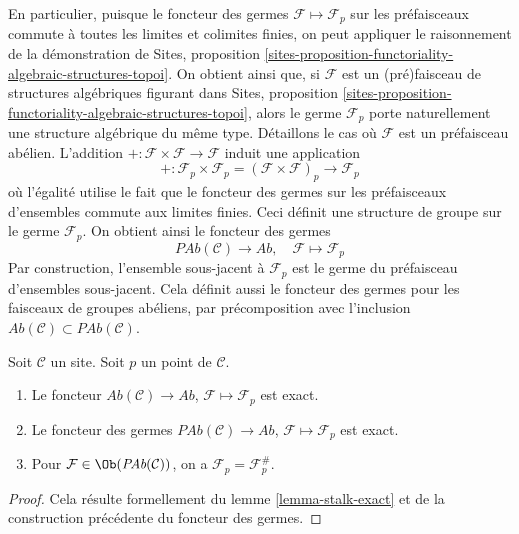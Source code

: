 \noindent
En particulier, puisque le foncteur des germes
$\mathcal{F} \mapsto \mathcal{F}_p$ sur les préfaisceaux commute à toutes les
limites et colimites finies, on peut appliquer le raisonnement de la
démonstration de Sites, proposition
\ref{sites-proposition-functoriality-algebraic-structures-topoi}.
On obtient ainsi que, si $\mathcal{F}$ est un (pré)faisceau de structures
algébriques figurant dans Sites, proposition
\ref{sites-proposition-functoriality-algebraic-structures-topoi}, alors le germe
$\mathcal{F}_p$ porte naturellement une structure algébrique du même type.
Détaillons le cas où $\mathcal{F}$ est un préfaisceau abélien. L'addition
$+ : \mathcal{F} \times \mathcal{F} \to \mathcal{F}$ induit une application
$$
+ :
\mathcal{F}_p \times \mathcal{F}_p
=
(\mathcal{F} \times \mathcal{F})_p
\longrightarrow
\mathcal{F}_p
$$
où l'égalité utilise le fait que le foncteur des germes sur les préfaisceaux
d'ensembles commute aux limites finies. Ceci définit une structure de groupe
sur le germe $\mathcal{F}_p$. On obtient ainsi le foncteur des germes
$$
\textit{PAb}(\mathcal{C}) \longrightarrow \textit{Ab}, \quad
\mathcal{F} \longmapsto \mathcal{F}_p
$$
Par construction, l'ensemble sous-jacent à $\mathcal{F}_p$ est le germe du
préfaisceau d'ensembles sous-jacent. Cela définit aussi le foncteur des germes pour
les faisceaux de groupes abéliens, par précomposition avec l'inclusion
$\textit{Ab}(\mathcal{C}) \subset \textit{PAb}(\mathcal{C})$.

\begin{lemma}
\label{lemma-stalk-exact-abelian}
Soit $\mathcal{C}$ un site.
Soit $p$ un point de $\mathcal{C}$.
\begin{enumerate}
\item Le foncteur
$\textit{Ab}(\mathcal{C}) \to \textit{Ab}$,
$\mathcal{F} \mapsto \mathcal{F}_p$ est exact.
\item Le foncteur des germes
$\textit{PAb}(\mathcal{C}) \to \textit{Ab}$,
$\mathcal{F}  \mapsto  \mathcal{F}_p$
est exact.
\item Pour $\mathcal{F} \in \Ob(\textit{PAb}(\mathcal{C}))$, on a
$\mathcal{F}_p = \mathcal{F}^\#_p$.
\end{enumerate}
\end{lemma}

\begin{proof}
Cela résulte formellement du lemme \ref{lemma-stalk-exact} et de la
construction précédente du foncteur des germes.
\end{proof}

